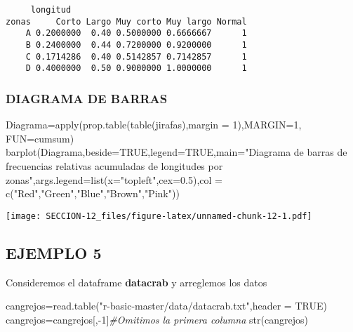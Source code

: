 \documentclass[
]{article}
\newenvironment{Shaded}{\begin{snugshade}}{\end{snugshade}}
\newcommand{\AttributeTok}[1]{\textcolor[rgb]{0.77,0.63,0.00}{#1}}
\newcommand{\CommentTok}[1]{\textcolor[rgb]{0.56,0.35,0.01}{\textit{#1}}}
\newcommand{\ConstantTok}[1]{\textcolor[rgb]{0.00,0.00,0.00}{#1}}
\newcommand{\DecValTok}[1]{\textcolor[rgb]{0.00,0.00,0.81}{#1}}
\newcommand{\FloatTok}[1]{\textcolor[rgb]{0.00,0.00,0.81}{#1}}
\newcommand{\FunctionTok}[1]{\textcolor[rgb]{0.00,0.00,0.00}{#1}}
\newcommand{\NormalTok}[1]{#1}
\newcommand{\OtherTok}[1]{\textcolor[rgb]{0.56,0.35,0.01}{#1}}
\newcommand{\SpecialCharTok}[1]{\textcolor[rgb]{0.00,0.00,0.00}{#1}}
\newcommand{\StringTok}[1]{\textcolor[rgb]{0.31,0.60,0.02}{#1}}
\begin{document}
\begin{verbatim}
     longitud
zonas     Corto Largo Muy corto Muy largo Normal
    A 0.2000000  0.40 0.5000000 0.6666667      1
    B 0.2400000  0.44 0.7200000 0.9200000      1
    C 0.1714286  0.40 0.5142857 0.7142857      1
    D 0.4000000  0.50 0.9000000 1.0000000      1
\end{verbatim}

\hypertarget{diagrama-de-barras}{%
\subsubsection{DIAGRAMA DE BARRAS}\label{diagrama-de-barras}}

\begin{Shaded}
\begin{Highlighting}[]
\NormalTok{Diagrama}\OtherTok{=}\FunctionTok{apply}\NormalTok{(}\FunctionTok{prop.table}\NormalTok{(}\FunctionTok{table}\NormalTok{(jirafas),}\AttributeTok{margin =} \DecValTok{1}\NormalTok{),}\AttributeTok{MARGIN=}\DecValTok{1}\NormalTok{, }\AttributeTok{FUN=}\NormalTok{cumsum)}
\FunctionTok{barplot}\NormalTok{(Diagrama,}\AttributeTok{beside=}\ConstantTok{TRUE}\NormalTok{,}\AttributeTok{legend=}\ConstantTok{TRUE}\NormalTok{,}\AttributeTok{main=}\StringTok{"Diagrama de barras de frecuencias relativas acumuladas de longitudes por zonas"}\NormalTok{,}\AttributeTok{args.legend=}\FunctionTok{list}\NormalTok{(}\AttributeTok{x=}\StringTok{"topleft"}\NormalTok{,}\AttributeTok{cex=}\FloatTok{0.5}\NormalTok{),}\AttributeTok{col =} \FunctionTok{c}\NormalTok{(}\StringTok{"Red"}\NormalTok{,}\StringTok{"Green"}\NormalTok{,}\StringTok{"Blue"}\NormalTok{,}\StringTok{"Brown"}\NormalTok{,}\StringTok{"Pink"}\NormalTok{))}
\end{Highlighting}
\end{Shaded}

\texttt{[image: SECCION-12\_files/figure-latex/unnamed-chunk-12-1.pdf]}

\hypertarget{ejemplo-5}{%
\subsection{EJEMPLO 5}\label{ejemplo-5}}

Consideremos el dataframe \textbf{datacrab} y arreglemos los datos

\begin{Shaded}
\begin{Highlighting}[]
\NormalTok{cangrejos}\OtherTok{=}\FunctionTok{read.table}\NormalTok{(}\StringTok{"r{-}basic{-}master/data/datacrab.txt"}\NormalTok{,}\AttributeTok{header =} \ConstantTok{TRUE}\NormalTok{)}
\NormalTok{cangrejos}\OtherTok{=}\NormalTok{cangrejos[,}\SpecialCharTok{{-}}\DecValTok{1}\NormalTok{]}\CommentTok{\#Omitimos la primera columna}
\FunctionTok{str}\NormalTok{(cangrejos)}
\end{Highlighting}
\end{Shaded}
\end{document}
